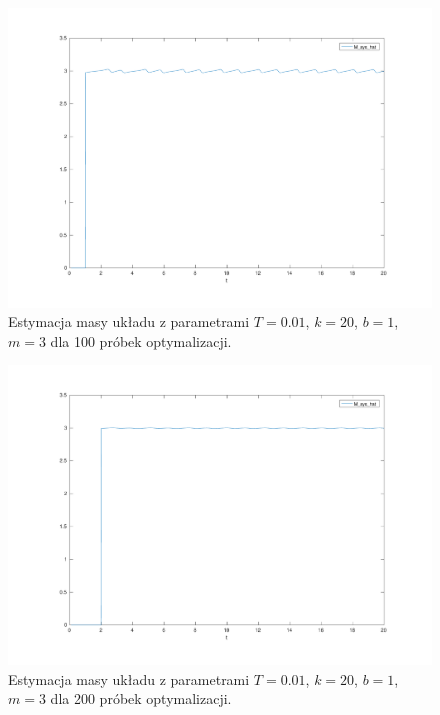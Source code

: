 \documentclass[a4paper, 10pt]{article}
\begin{document}
\begin{figure}[H]
	\includegraphics[width=0.99\linewidth]{system100_mass}
	\centering
	\caption{Estymacja masy układu z parametrami $T=0.01$, $k = 20$, $b = 1$, $m = 3$ dla 100 próbek optymalizacji.}
	\label{fig:system100_mass}
\end{figure}

\begin{figure}[H]
	\includegraphics[width=0.99\linewidth]{system200_mass}
	\centering
	\caption{Estymacja masy układu z parametrami $T=0.01$, $k = 20$, $b = 1$, $m = 3$ dla 200 próbek optymalizacji.}
	\label{fig:system200_mass}
\end{figure}
\end{document}
